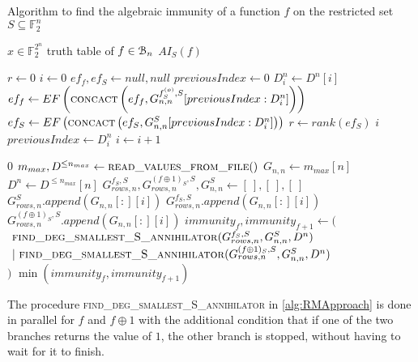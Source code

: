 \documentclass[11pt]{llncs}
\begin{document}
\begin{algorithm}\label{alg:RMApproach}
	\caption{Algorithm to find the algebraic immunity of a function $f$ on the restricted set $S\subseteq \mathbb{F}_2^n$}
	\begin{algorithmic}[1]
		\Require $x\in \mathbb{F}_2^{2^n}$ truth table of $f\in \mathcal{B}_{n}$
		\Ensure $AI_S(f)$
		
		\State $r \gets 0$
		\State $i \gets 0$
		\State $ef_f, ef_S \gets null, null$
		\State $previousIndex \gets 0$
		\State $D_i^n \gets D^n[i]$
		\State $ef_f\gets EF\left(\mbox{\textsc{concact}}\left(ef_f, G_{n,n}^{f_S^{(o)},S}[previousIndex:D_i^n]\right)\right)$
		\State $ef_S \gets EF\left(\mbox{\textsc{concact}}\left(ef_S, G_{n,n}^S[previousIndex:D_i^n]\right)\right)$
		\State $r \gets rank\left(ef_S\right)$
		\State
		\Return $i$
		\EndIf
		\State $previousIndex \gets D_i^n$
		\State $i \gets i+1$
		\EndWhile
		\EndFunction
		\State
		
		\Return $0$
		\EndIf
		\State $m_{max}, D^{\leq n_{max}}\gets \mbox{\textsc{read\_values\_from\_file}}()$
		\State $G_{n,n}\gets m_{max}[n]$
		\State $D^n \gets D^{\leq n_{max}}[n]$
		\State $G_{rows,n}^{f_S,S}, G_{rows,n}^{(f\oplus 1)_S,S}, G_{n,n}^S \gets [\ ], [\ ], [\ ]$
		\State $G_{rows,n}^{S}.append\left(G_{n,n}[:][i]\right)$
		\State $G_{rows,n}^{f_S,S}.append\left(G_{n,n}[:][i]\right)$
		\Else
		\State $G_{rows,n}^{(f\oplus 1)_S,S}.append\left(G_{n,n}[:][i]\right)$
		\EndIf
		\EndIf
		\EndFor
		\State $immunity_f, immunity_{f+1} \leftarrow ($\\
		$\ \mbox{\textsc{find\_deg\_smallest\_S\_annihilator}}(G_{rows,n}^{f_S,S}, G_{n,n}^S,D^{n})$\\
		$\ |\ \mbox{\textsc{find\_deg\_smallest\_S\_annihilator}}(G_{rows,n}^{(f\oplus 1)_S,S}, G_{n,n}^S, D^{n})$\\
		$)$
		\State {}
		\State \Return $\min(immunity_f, immunity_{f+1})$
	\end{algorithmic}
\end{algorithm}

\begin{remark}
	The procedure \textsc{find\_deg\_smallest\_S\_annihilator} in \ref{alg:RMApproach} is done in parallel for $f$ and $f\oplus 1$ with the additional condition that if one of the two branches returns the value of $1$, the other branch is stopped, without having to wait for it to finish.
\end{remark}
\end{document}
